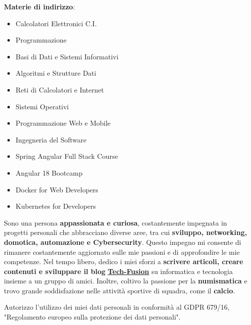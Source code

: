 

\textbf{Materie di indirizzo}: %
\begin{itemize}
    \item Calcolatori Elettronici C.I.
    \item Programmazione
    \item Basi di Dati e Sistemi Informativi
    \item Algoritmi e Strutture Dati
    \item Reti di Calcolatori e Internet
    \item Sistemi Operativi
    \item Programmazione Web e Mobile
    \item Ingegneria del Software
\end{itemize}




\begin{itemize}
    \item Spring Angular Full Stack Course
    \item Angular 18 Bootcamp
    \item Docker for Web Developers
    \item Kubernetes for Developers
\end{itemize}


Sono una persona \textbf{appassionata e curiosa}, costantemente impegnata in progetti personali che abbracciano diverse aree, tra cui \textbf{sviluppo, networking, domotica, automazione e Cybersecurity}. Questo impegno mi consente di rimanere costantemente aggiornato sulle mie passioni e di approfondire le mie competenze. Nel tempo libero, dedico i miei sforzi a \textbf{scrivere articoli, creare contenuti e sviluppare il blog} \href{https://tech-fusion.it/}{\textbf{Tech-Fusion}} su informatica e tecnologia insieme a un gruppo di amici. Inoltre, coltivo la passione per la \textbf{numismatica} e trovo grande soddisfazione nelle attività sportive di squadra, come il \textbf{calcio}.



\divider

\footnotesize{Autorizzo l'utilizzo dei miei dati personali in conformità al GDPR 679/16, "Regolamento europeo sulla protezione dei dati personali".}


